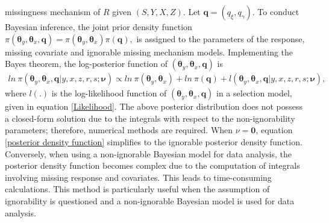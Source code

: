 \documentclass[twoside]{article}
\begin{document}
missingness mechanism of $R$ given $(S, Y, X, Z)$.
Let $\mathbf{q}=(q_\xi,q_\gamma)$. To conduct Bayesian inference, the joint prior density function
$
\pi (\pmb\theta_y , \pmb\theta_x,\mathbf{q})=\pi(\pmb\theta_y , \pmb\theta_x)\pi(\mathbf{q}),
$
is assigned to the parameters of the response, missing covariate and ignorable
missing mechanism models. Implementing the Bayes theorem, the log-posterior  function of $(\pmb\theta_y , \pmb\theta_x,\mathbf{q})$ is
\begin{align}
ln~\pi(\pmb\theta_y,\pmb\theta_x,\mathbf{q} | y,x,z,r,s;\pmb\nu)\propto ln~\pi(\pmb\theta_y,\pmb\theta_x)+ln~\pi(\mathbf{q})+l(\pmb\theta_y,\pmb\theta_x, \mathbf{q} |y,x,z,r,s;\pmb\nu),\label{posterior density function}
\end{align}
where $l(.)$ is the log-likelihood function of   $(\pmb\theta_y,\pmb\theta_x, \mathbf{q})$ in a selection model, given in equation \eqref{Likelihood}. The above posterior distribution does not possess a closed-form solution due to the integrals with respect to the non-ignorability parameters; therefore, numerical methods are required.
When $\nu =\mathbf{0}$, equation \eqref{posterior density function} simplifies to the ignorable   posterior density function. Conversely, when using a non-ignorable Bayesian model for data analysis, the
posterior density function becomes complex due to the computation of integrals
involving missing response and covariates. This
leads to time-consuming calculations. This method is particularly useful when the assumption
of ignorability is questioned and a non-ignorable Bayesian model is used for data
analysis. 
\end{document}
